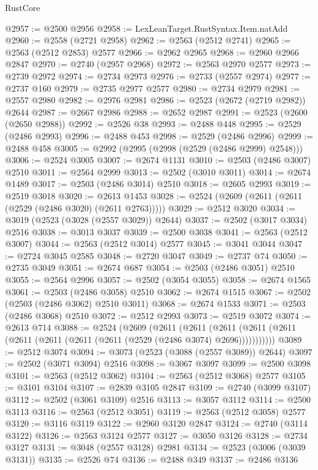 \begin{lexlean}{RustCore}
\begin{coremodule}
@2957 := @2500 @2956
@2958 := LexLeanTarget.RustSyntax.Item.natAdd
@2960 := @2558 (@2721 @2958)
@2962 := @2563 (@2512 @2741)
@2965 := @2563 (@2512 @2853) @2577
@2966 := @2962 @2965
@2968 := @2960 @2966 @2847
@2970 := @2740 (@2957 @2968)
@2972 := @2563 @2970 @2577
@2973 := @2739 @2972
@2974 := @2734 @2973
@2976 := @2733 (@2557 @2974)
@2977 := @2737 @160
@2979 := @2735 @2977 @2577
@2980 := @2734 @2979
@2981 := @2557 @2980
@2982 := @2976 @2981
@2986 := @2523 (@2672 (@2719 @2982)) @2644
@2987 := @2667 @2986
@2988 := @2652 @2987
@2991 := @2523 (@2600 (@2650 @2988))
@2992 := @2526 @38
@2993 := @2488 @448
@2995 := @2529 (@2486 @2993)
@2996 := @2488 @453
@2998 := @2529 (@2486 @2996)
@2999 := @2488 @458
@3005 := @2992 (@2995 (@2998 (@2529 (@2486 @2999) @2548)))
@3006 := @2524 @3005
@3007 := @2674 @1131
@3010 := @2503 (@2486 @3007) @2510
@3011 := @2564 @2999
@3013 := @2502 (@3010 @3011)
@3014 := @2674 @1489
@3017 := @2503 (@2486 @3014) @2510
@3018 := @2605 @2993
@3019 := @2519 @3018
@3020 := @2613 @1453
@3028 := @2524 (@2609 (@2611 (@2611 (@2529 (@2486 @3020) (@2611 @2763)))))
@3029 := @2512 @3020
@3034 := @3019 (@2523 (@3028 (@2557 @3029)) @2644)
@3037 := @2502 (@3017 @3034) @2516
@3038 := @3013 @3037
@3039 := @2500 @3038
@3041 := @2563 (@2512 @3007)
@3044 := @2563 (@2512 @3014) @2577
@3045 := @3041 @3044
@3047 := @2724 @3045 @2585
@3048 := @2720 @3047
@3049 := @2737 @74
@3050 := @2735 @3049
@3051 := @2674 @687
@3054 := @2503 (@2486 @3051) @2510
@3055 := @2564 @2996
@3057 := @2502 (@3054 @3055)
@3058 := @2674 @1565
@3061 := @2503 (@2486 @3058) @2510
@3062 := @2674 @1515
@3067 := @2502 (@2503 (@2486 @3062) @2510 @3011)
@3068 := @2674 @1533
@3071 := @2503 (@2486 @3068) @2510
@3072 := @2512 @2993
@3073 := @2519 @3072
@3074 := @2613 @714
@3088 := @2524
    (@2609
      (@2611
        (@2611
          (@2611 (@2611 (@2611 (@2611 (@2611 (@2611 (@2611 (@2529 (@2486 @3074) @2696)))))))))))
@3089 := @2512 @3074
@3094 := @3073 (@2523 (@3088 (@2557 @3089)) @2644)
@3097 := @2502 (@3071 @3094) @2516
@3098 := @3067 @3097
@3099 := @2500 @3098
@3101 := @2563 (@2512 @3062)
@3104 := @2563 (@2512 @3068) @2577
@3105 := @3101 @3104
@3107 := @2839 @3105 @2847
@3109 := @2740 (@3099 @3107)
@3112 := @2502 (@3061 @3109) @2516
@3113 := @3057 @3112
@3114 := @2500 @3113
@3116 := @2563 (@2512 @3051)
@3119 := @2563 (@2512 @3058) @2577
@3120 := @3116 @3119
@3122 := @2960 @3120 @2847
@3124 := @2740 (@3114 @3122)
@3126 := @2563 @3124 @2577
@3127 := @3050 @3126
@3128 := @2734 @3127
@3131 := @3048 (@2557 @3128) @2981
@3134 := @2523 (@3006 (@3039 @3131))
@3135 := @2526 @74
@3136 := @2488 @349
@3137 := @2486 @3136

\end{coremodule}
\end{lexlean}
